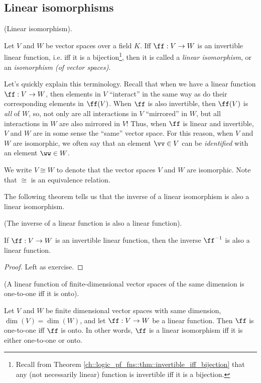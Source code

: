 \newpage

\subsection*{Linear isomorphisms}

\begin{defn}
\label{ch::lin_alg::defn::linear_iso}
    (Linear isomorphism).
    
    Let $V$ and $W$ be vector spaces over a field $K$. Iff $\ff:V \rightarrow W$ is an invertible linear function, i.e. iff it is a bijection\footnote{Recall from Theorem \ref{ch::logic_pf_fns::thm::invertible_iff_bijection} that any (not necessarily linear) function is invertible iff it is a bijection.}, then it is called a \textit{linear isomorphism}, or an \textit{isomorphism (of vector spaces)}.
    
    Let's quickly explain this terminology. Recall that when we have a linear function $\ff:V \rightarrow W$, then elements in $V$ ``interact'' in the same way as do their corresponding elements in $\ff(V)$. When $\ff$ is also invertible, then $\ff(V)$ is \textit{all} of $W$, so, not only are all interactions in $V$ ``mirrored'' in $W$, but all interactions in $W$ are also mirrored in $V$! Thus, when $\ff$ is linear and invertible, $V$ and $W$ are in some sense the ``same'' vector space. For this reason, when $V$ and $W$ are isomorphic, we often say that an element $\vv \in V$ can be \textit{identified} with an element $\ww \in W$.
    
    We write $V \cong W$ to denote that the vector spaces $V$ and $W$ are isomorphic. Note that $\cong$ is an equivalence relation.
\end{defn}

The following theorem tells us that the inverse of a linear isomorphism is also a linear isomorphism.

\begin{theorem}
    (The inverse of a linear function is also a linear function).
    
    If $\ff:V \rightarrow W$ is an invertible linear function, then the inverse $\ff^{-1}$ is also a linear function.
\end{theorem}

\begin{proof}
     Left as exercise.
\end{proof}

\begin{theorem}
    \label{ch::lin_alg::thm::linear_fn_1-1_iff_onto}
    
    (A linear function of finite-dimensional vector spaces of the same dimension is one-to-one iff it is onto).
    
    Let $V$ and $W$ be finite dimensional vector spaces with same dimension, $\dim(V) = \dim(W)$, and let ${\ff:V \rightarrow W}$ be a linear function. Then $\ff$ is one-to-one iff $\ff$ is onto. In other words, $\ff$ is a linear isomorphism iff it is either one-to-one or onto.
\end{theorem}

